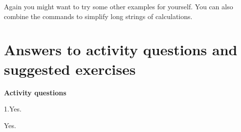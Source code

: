 Again you might want to try some other examples for yourself.  You
can also combine the commands to simplify long strings of
calculations. \fi

\section{Answers to activity questions and suggested exercises}
\label{answers2}

{\bf Activity questions}

\bigskip

\noindent {\bf \ref{ssec.arith}:} \quad 1.Yes.

\bigskip

\noindent{\bf \ref{ssec.propma}:} \quad Yes.

\bigskip



